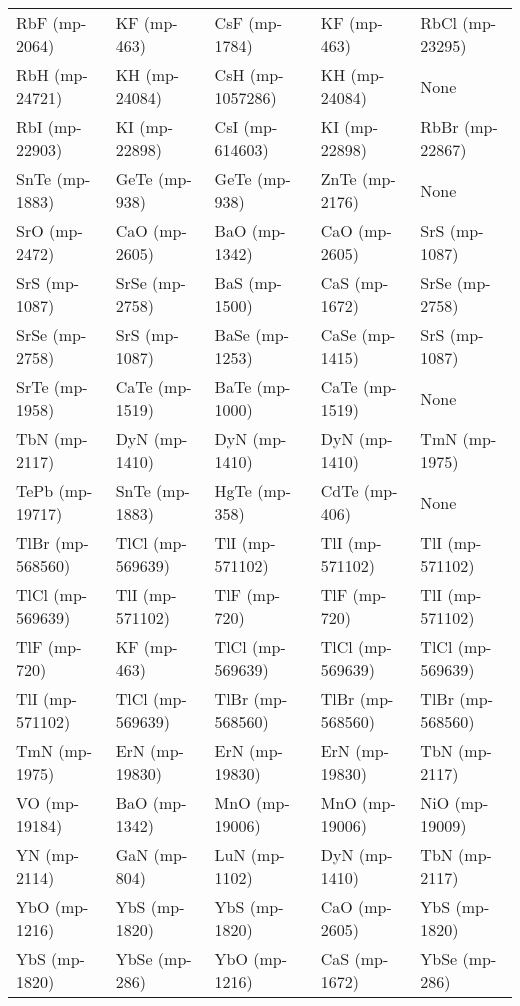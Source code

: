 \begin{longtable}{lllll}
    RbF (mp-2064) &       KF (mp-463) &     CsF (mp-1784) &       KF (mp-463) &   RbCl (mp-23295) \\
   RbH (mp-24721) &     KH (mp-24084) &  CsH (mp-1057286) &     KH (mp-24084) &              None \\
   RbI (mp-22903) &     KI (mp-22898) &   CsI (mp-614603) &     KI (mp-22898) &   RbBr (mp-22867) \\
   SnTe (mp-1883) &     GeTe (mp-938) &     GeTe (mp-938) &    ZnTe (mp-2176) &              None \\
    SrO (mp-2472) &     CaO (mp-2605) &     BaO (mp-1342) &     CaO (mp-2605) &     SrS (mp-1087) \\
    SrS (mp-1087) &    SrSe (mp-2758) &     BaS (mp-1500) &     CaS (mp-1672) &    SrSe (mp-2758) \\
   SrSe (mp-2758) &     SrS (mp-1087) &    BaSe (mp-1253) &    CaSe (mp-1415) &     SrS (mp-1087) \\
   SrTe (mp-1958) &    CaTe (mp-1519) &    BaTe (mp-1000) &    CaTe (mp-1519) &              None \\
    TbN (mp-2117) &     DyN (mp-1410) &     DyN (mp-1410) &     DyN (mp-1410) &     TmN (mp-1975) \\
  TePb (mp-19717) &    SnTe (mp-1883) &     HgTe (mp-358) &     CdTe (mp-406) &              None \\
 TlBr (mp-568560) &  TlCl (mp-569639) &   TlI (mp-571102) &   TlI (mp-571102) &   TlI (mp-571102) \\
 TlCl (mp-569639) &   TlI (mp-571102) &      TlF (mp-720) &      TlF (mp-720) &   TlI (mp-571102) \\
     TlF (mp-720) &       KF (mp-463) &  TlCl (mp-569639) &  TlCl (mp-569639) &  TlCl (mp-569639) \\
  TlI (mp-571102) &  TlCl (mp-569639) &  TlBr (mp-568560) &  TlBr (mp-568560) &  TlBr (mp-568560) \\
    TmN (mp-1975) &    ErN (mp-19830) &    ErN (mp-19830) &    ErN (mp-19830) &     TbN (mp-2117) \\
    VO (mp-19184) &     BaO (mp-1342) &    MnO (mp-19006) &    MnO (mp-19006) &    NiO (mp-19009) \\
     YN (mp-2114) &      GaN (mp-804) &     LuN (mp-1102) &     DyN (mp-1410) &     TbN (mp-2117) \\
    YbO (mp-1216) &     YbS (mp-1820) &     YbS (mp-1820) &     CaO (mp-2605) &     YbS (mp-1820) \\
    YbS (mp-1820) &     YbSe (mp-286) &     YbO (mp-1216) &     CaS (mp-1672) &     YbSe (mp-286) \\

\end{longtable}
